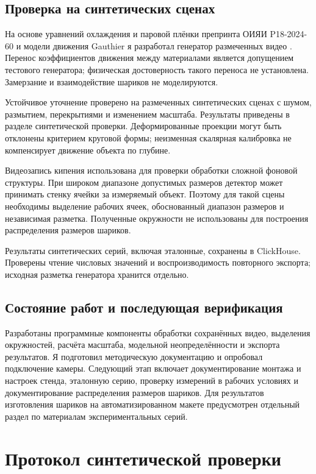 \documentclass[12pt,a4paper]{article}
\begin{document}
\subsection{Проверка на синтетических сценах}
На основе уравнений охлаждения и паровой плёнки препринта ОИЯИ P18-2024-60 и модели движения Gauthier я разработал генератор размеченных видео \cite{simulation}. Перенос коэффициентов движения между материалами является допущением тестового генератора; физическая достоверность такого переноса не установлена. Замерзание и взаимодействие шариков не моделируются.

Устойчивое уточнение проверено на размеченных синтетических сценах с шумом, размытием, перекрытиями и изменением масштаба. Результаты приведены в разделе синтетической проверки. Деформированные проекции могут быть отклонены критерием круговой формы; неизменная скалярная калибровка не компенсирует движение объекта по глубине.

Видеозапись кипения использована для проверки обработки сложной фоновой структуры. При широком диапазоне допустимых размеров детектор может принимать стенку ячейки за измеряемый объект. Поэтому для такой сцены необходимы выделение рабочих ячеек, обоснованный диапазон размеров и независимая разметка. Полученные окружности не использованы для построения распределения размеров шариков.

Результаты синтетических серий, включая эталонные, сохранены в ClickHouse. Проверены чтение числовых значений и воспроизводимость повторного экспорта; исходная разметка генератора хранится отдельно.

\subsection{Состояние работ и последующая верификация}
Разработаны программные компоненты обработки сохранённых видео, выделения окружностей, расчёта масштаба, модельной неопределённости и экспорта результатов. Я подготовил методическую документацию и опробовал подключение камеры. Следующий этап включает документирование монтажа и настроек стенда, эталонную серию, проверку измерений в рабочих условиях и документирование распределения размеров шариков. Для результатов изготовления шариков на автоматизированном макете предусмотрен отдельный раздел по материалам экспериментальных серий.

\section{Протокол синтетической проверки}
\end{document}
